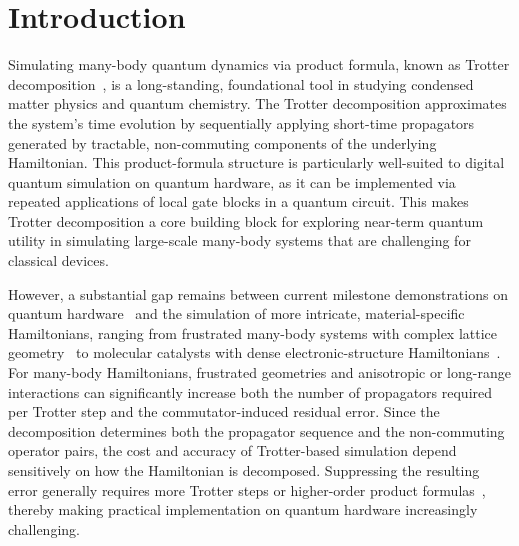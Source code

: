 \documentclass[aps,showpacs,amsmath,amssymb,twocolumn,prx,longbibliography,superscriptaddress,notitlepage,floatfix,10pt]{revtex4-2}
\begin{document}
\maketitle






\section{Introduction}


Simulating many-body quantum dynamics via product formula, known as Trotter decomposition~\cite{Trotter1959On, Suzuki1976Generalized, Hatano2005Finding}, is a long-standing, foundational tool in studying condensed matter physics and quantum chemistry.
The Trotter decomposition approximates the system's time evolution by sequentially applying short-time propagators generated by tractable, non-commuting components of the underlying Hamiltonian.
This product-formula structure is particularly well-suited to digital quantum simulation on quantum hardware, as it can be implemented via repeated applications of local gate blocks in a quantum circuit.
This makes Trotter decomposition a core building block for exploring near-term quantum utility in simulating large-scale many-body systems that are challenging for classical devices.

However, a substantial gap remains between current milestone demonstrations on quantum hardware~\cite{Kim2023Evidence, Whitlow2023Quantum, Chowdhury2024Enhancing, Farrell2024Quantum, Miessen2024Benchmarking, Yoshioka2025Krylov} and the simulation of more intricate, material-specific Hamiltonians, ranging from frustrated many-body systems with complex lattice geometry~\cite{Di-Sante2026Kagome} to molecular catalysts with dense electronic-structure Hamiltonians~\cite{Luo2025Efficient, Kan2025Resource-optimized, Ronevi2026A}.
For many-body Hamiltonians, frustrated geometries and anisotropic or long-range interactions can significantly increase both the number of propagators required per Trotter step and the commutator-induced residual error.
Since the decomposition determines both the propagator sequence and the non-commuting operator pairs, the cost and accuracy of Trotter-based simulation depend sensitively on how the Hamiltonian is decomposed.
Suppressing the resulting error generally requires more Trotter steps or higher-order product formulas~\cite{Suzuki1976Generalized, Hatano2005Finding}, thereby making practical implementation on quantum hardware increasingly challenging.
\end{document}
